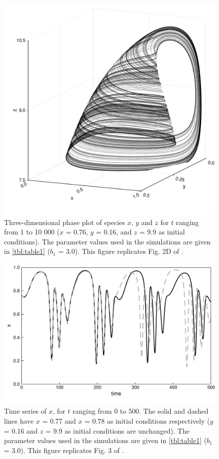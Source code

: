 \newpage

\begin{figure}
  \centering
  \includegraphics[scale=0.7]{figures/fig2d.pdf}
  \caption{Three-dimensional phase plot of species $x$, $y$ and $z$ for $t$ ranging from 1 to 10 000 ($x$ = 0.76, $y$ = 0.16, and $z$ = 9.9 as initial conditions). The parameter values used in the simulations are given in \autoref{tbl:table1} ($b_1$ = 3.0). This figure replicates Fig. 2D of \citet{hastings1991}.}
  \label{fig:fig2d}
\end{figure}

\newpage

\begin{figure}
  \centering
  \includegraphics[scale=0.7]{figures/fig3.pdf}
  \caption{Time series of $x$, for $t$ ranging from 0 to 500. The solid and dashed lines have  $x$ = 0.77 and $x$ = 0.78 as initial conditions respectively ($y$ = 0.16 and $z$ = 9.9 as initial conditions are unchanged). The parameter values used in the simulations are given in \autoref{tbl:table1} ($b_1$ = 3.0). This figure replicates Fig. 3 of \citet{hastings1991}.}
  \label{fig:fig3}
\end{figure}

